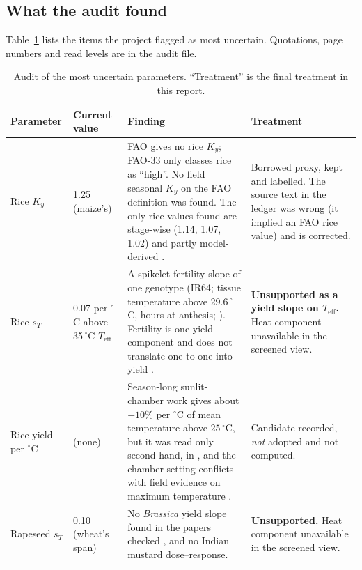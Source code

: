 \begin{table}[H]\centering\small
\caption[Register by status and applicability]{The \parNRows\ register rows by status and applicability. Rows
without an applicability grade are perturbation ranges.}\label{tab:parstatus}
\end{table}

\subsection{What the audit found}
Table~\ref{tab:parkey} lists the items the project flagged as most uncertain. Quotations, page numbers and read levels
are in the audit file.

\begin{table}[H]\centering\scriptsize
\caption[Audit of the most uncertain parameters]{Audit of the most uncertain parameters. ``Treatment'' is the final
treatment in this report.}\label{tab:parkey}
\begin{tabular}{@{}p{2.2cm}p{1.9cm}p{6.7cm}p{3.9cm}@{}}
\toprule
Parameter & Current value & Finding & Treatment \\
\midrule
Rice $K_y$ & 1.25 (maize's) & FAO gives no rice $K_y$; FAO-33 only classes rice as ``high''. No field seasonal $K_y$ on the FAO definition was found. The only rice values found are stage-wise (1.14, 1.07, 1.02) and partly model-derived \citep{anupoju2020}. & Borrowed proxy, kept and labelled. The source text in the ledger was wrong (it implied an FAO rice value) and is corrected. \\
Rice $s_T$ & 0.07 per $^\circ$C above 35\,$^\circ$C $T_{\text{eff}}$ & A spikelet-fertility slope of one genotype (IR64; tissue temperature above 29.6\,$^\circ$C, hours at anthesis; \citealp{jagadish2007}). Fertility is one yield component and does not translate one-to-one into yield \citep{prasad2006rice,hatfield2011}. & \textbf{Unsupported as a yield slope on $T_{\text{eff}}$.} Heat component unavailable in the screened view. \\
Rice yield per $^\circ$C & (none) & Season-long sunlit-chamber work gives about $-10\%$ per $^\circ$C of mean temperature above $25\,^\circ$C, but it was read only second-hand, in \citet{hatfield2011}, and the chamber setting conflicts with field evidence on maximum temperature \citep{welch2010}. & Candidate recorded, \emph{not} adopted and not computed. \\
Rapeseed $s_T$ & 0.10 (wheat's span) & No \emph{Brassica} yield slope found in the papers checked \citep{morrison2002,kutcher2010,gan2004,angadi2000,nuttall1992}, and no Indian mustard dose--response. & \textbf{Unsupported.} Heat component unavailable in the screened view. \\

\end{tabular}
\end{table}
